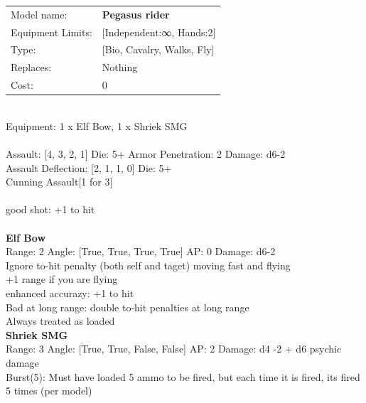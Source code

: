 \noindent
\begin{tabular}{ll}
Model name: &{\bf Pegasus rider } \\
Equipment Limits: &[Independent:∞, Hands:2] \\
Type: &[Bio, Cavalry, Walks, Fly] \\
Replaces: &Nothing \\
Cost: & 0\\
\end{tabular}
\ \\
Equipment: 1 x Elf Bow, 1 x Shriek SMG \\
\ \\
Assault: [4, 3, 2, 1] Die: 5+ Armor Penetration: 2 Damage: d6-2 \\
Assault Deflection: [2, 1, 1, 0] Die: 5+\\
\indent Cunning Assault[1 for 3]\\ 
 
\ \\
good shot: +1 to hit\\ 

\ \\
{\bf Elf Bow } \\



Range: 2  Angle: [True, True, True, True] AP: 0 Damage: d6-2 \\
Ignore to-hit penalty (both self and taget) moving fast and flying\\ 
+1 range if you are flying\\ 
enhanced accurazy: +1 to hit\\ 
Bad at long range: double to-hit penalties at long range\\ 
Always treated as loaded\\ 




{\bf Shriek SMG } \\



Range: 3  Angle: [True, True, False, False] AP: 2 Damage: d4 -2 + d6 psychic damage \\
Burst(5): Must have loaded 5 ammo to be fired, but each time it is fired, its fired 5 times (per model)\\ 




 
\ \\













